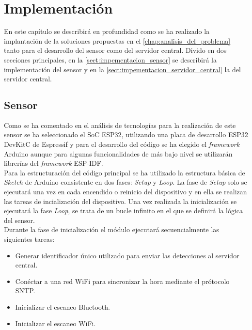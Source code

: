 \documentclass[../proyecto.tex]{subfiles}
\begin{document}
\chapter{Implementación}\label{chap:implementacion}

En este capítulo se describirá en profundidad como se ha realizado la implantación de la soluciones propuestas en el \autoref{chap:analisis_del_problema} tanto para el desarrollo del sensor como del servidor central. Divido en dos secciones principales, en la \autoref{sect:impementacion_sensor} se describirá la implementación del sensor y en la \autoref{sect:impementacion_servidor_central} la del servidor central.\\

 \section{Sensor}\label{sect:impementacion_sensor}

Como se ha comentado en el análisis de tecnologías para la realización de este sensor se ha seleccionado el SoC ESP32, utilizando una placa de desarrollo ESP32 DevKitC de Espressif y para el desarrollo del código se ha elegido el \textit{framework} Arduino aunque para algunas funcionalidades de más bajo nivel se utilizarán librerías del \textit{framework} ESP-IDF.\\

Para la estructuración del código principal se ha utilizado la estructura básica de \textit{Sketch} de Arduino consistente en dos fases: \textit{Setup} y \textit{Loop}. La fase de \textit{Setup} solo se ejecutará una vez en cada encendido o reinicio del dispositivo y en ella se realizan las tareas de incialización del dispositivo. Una vez realizada la inicialización se ejecutará la fase \textit{Loop}, se trata de un bucle infinito en el que se definirá la lógica del sensor.\\

Durante la fase de inicialización el módulo ejecutará secuencialmente las siguientes tareas:
\begin{itemize}
  \item Generar identificador único utilizado para enviar las detecciones al servidor central.
  \item Conéctar a una red WiFi para sincronizar la hora mediante el prótocolo SNTP.
  \item Inicializar el escaneo Bluetooth.
  \item Inicializar el escaneo WiFi.
\end{itemize}
\end{document}
